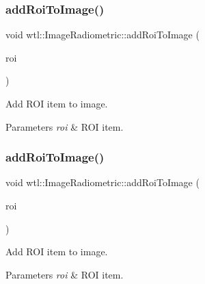 \subsubsection{\texorpdfstring{add\+Roi\+To\+Image()}{addRoiToImage()}\hspace{0.1cm}{\footnotesize\ttfamily [1/2]}}
{\footnotesize\ttfamily void wtl\+::\+Image\+Radiometric\+::add\+Roi\+To\+Image (\begin{DoxyParamCaption}\item[{std\+::shared\+\_\+ptr$<$ \hyperlink{structwtl_1_1_roi_struct}{Roi\+Struct} $>$}]{roi }\end{DoxyParamCaption})}



Add R\+OI item to image. 


\begin{DoxyParams}{Parameters}
{\em roi} & R\+OI item. \\
\hline
\end{DoxyParams}
\mbox{\label{classwtl_1_1_image_radiometric_ad7b4937dedd3d70c0be19b41940f3083}} 
\subsubsection{\texorpdfstring{add\+Roi\+To\+Image()}{addRoiToImage()}\hspace{0.1cm}{\footnotesize\ttfamily [2/2]}}
{\footnotesize\ttfamily void wtl\+::\+Image\+Radiometric\+::add\+Roi\+To\+Image (\begin{DoxyParamCaption}\item[{const \hyperlink{structwtl_1_1_roi_struct}{Roi\+Struct} \&}]{roi }\end{DoxyParamCaption})}



Add R\+OI item to image. 


\begin{DoxyParams}{Parameters}
{\em roi} & R\+OI item. \\
\hline
\end{DoxyParams}
\mbox{\label{classwtl_1_1_image_radiometric_a6589459ee934ba5b857db30d359150b1}} 
